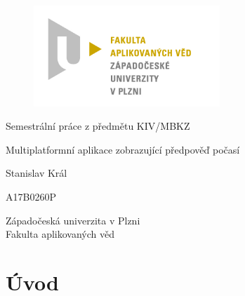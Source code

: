 \documentclass[12pt, a4paper]{article}
\let\oldsection\section
\renewcommand\section{\clearpage\oldsection}
\begin{document}
	\renewcommand{\lstlistingname}{Ukázka kódu}
	\renewcommand{\lstlistlistingname}{Seznam ukázek kódu}
    \begin{titlepage}

       \centering

       \vspace*{\baselineskip}

       \begin{figure}[H]
          \centering
          \includegraphics[width=7cm]{img/fav-logo.jpg}
       \end{figure}

       \vspace*{1\baselineskip}
       {\sc Semestrální práce z předmětu KIV/MBKZ}
       \vspace*{1\baselineskip}

       \vspace{0.75\baselineskip}

       {\LARGE\sc Multiplatformní aplikace zobrazující předpověď počasí\\}

       \vspace{4\baselineskip}
       
		\vspace{0.5\baselineskip}

       
       {\sc\Large Stanislav Král \\}

       \vspace{0.5\baselineskip}

       {A17B0260P}

       \vfill

       {\sc Západočeská univerzita v Plzni\\
       Fakulta aplikovaných věd}


    \end{titlepage}


    \tableofcontents
    \pagebreak

\section{Úvod}
\end{document}
